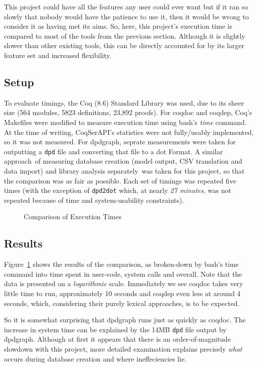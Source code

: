 This project could have all the features any user could ever want but if it ran
so slowly that nobody would have the patience to use it, then it would be wrong
to consider it as having met its aims. So, here, this project's execution time
is compared to most of the tools from the previous section. Although it is
slightly slower than other existing tools, this can be directly accounted for
by its larger feature set and increased flexibility.

\subsection{Setup}

To evaluate timings, the Coq (8.6) Standard Library was used, due to its sheer
size (564 modules, 5823 definitions, 23,892 proofs). For coqdoc and coqdep,
Coq's Makefiles were modified to measure execution time using bash's \emph{time}
command. At the time of writing, CoqSerAPI's statistics were not fully/usably
implemented, so it was not measured. For dpdgraph, seprate measurements were
taken for outputting a \texttt{dpd} file and converting that file to a dot
Format. A similar approach~\textendash of measuring database creation (model
output, CSV translation and data import) and library analysis
separately~\textendash was taken for this project, so that the comparison was as
fair as possible. Each set of timings was repeated five times (with the
exception of \texttt{dpd2dot} which, at nearly \emph{27 minutes}, was not
repeated because of time and system-usability constraints).

\begin{figure}[tp]
\centering

\caption{Comparison of Execution Times}\label{fig:exectimes}
\end{figure}

\subsection{Results}

Figure~\ref{fig:exectimes} shows the results of the comparison, as broken-down
by bash's time command into time spent in user-code, system calls and overall.
Note that the data is presented on a \emph{logarithmic} scale. Immediately
we see coqdoc takes very little time to run, approximately 10 seconds and coqdep
even less at around 4 seconds, which, considering their purely lexical
approaches, is to be expected.

So it is somewhat surprising that dpdgraph runs just as quickly as coqdoc. The
increase in system time can be explained by the 14MB \texttt{dpd} file output by
dpdgraph. Although at first it appears that there is an order-of-magnitude
slowdown with this project, more detailed examination explains precisely
\emph{what} occurs during database creation and where ineffeciencies lie.

